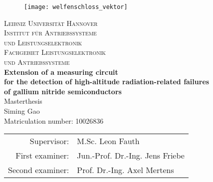 \begin{titlepage}
\enlargethispage{2.0cm}

\begin{center}

\vspace*{-2cm}


   \begin{figure}[h]
   \centering
       \texttt{[image: welfenschloss\_vektor]}
   \end{figure}

\vspace{1cm}

    {\LARGE \textsc{Leibniz Universität Hannover}}\\[1.0cm]

    {\Large \textsc{Institut für Antriebssysteme}} \\[0.2cm]
    {\Large \textsc{und Leistungselektronik}} \\ [0.4cm]

    {\Large \textsc{Fachgebiet Leistungselektronik}} \\ [0.2cm]
		{\Large \textsc{und Antriebssysteme}} \\ [1.7cm]

    {\Large \textbf{Extension of a measuring circuit \\[0.3cm] for the detection of high-altitude radiation-related failures\\[0.3cm] of  gallium nitride semiconductors } } \\ [3cm]
    {\Large Masterthesis} \\ [1.5cm]

    {\large Siming Gao} \\
    {Matriculation number: 10026836 } \\ [1.5cm]

    \begin{tabular}{rl}
      Supervisor:    & M.Sc. Leon Fauth\\
      First examiner:  & Jun.-Prof. Dr.-Ing. Jens Friebe\\
      Second examiner: & Prof. Dr.-Ing. Axel Mertens
    \end{tabular}

\end{center}

\end{titlepage}
